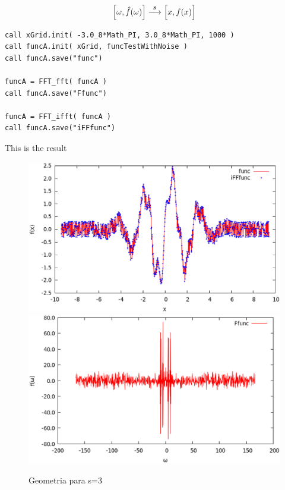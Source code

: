 \begin{equation}
\Bigl[\omega,\hat{f}(\omega)\Bigr]
\stackrel{\text{8}}{\longrightarrow}
\Bigl[x,f(x)\Bigr]
\end{equation}

\lstset{language=Fortran}
\begin{lstlisting}
call xGrid.init( -3.0_8*Math_PI, 3.0_8*Math_PI, 1000 )
call funcA.init( xGrid, funcTestWithNoise )
call funcA.save("func")  
  
funcA = FFT_fft( funcA )  
call funcA.save("Ffunc")  
  
funcA = FFT_ifft( funcA )  
call funcA.save("iFFfunc")  
\end{lstlisting}

This is the result

\begin{figure}[ht]
\centering
\includegraphics[scale=0.36]{images/FFT-func.eps}
\includegraphics[scale=0.36]{images/FFT-Ffunc.eps}
\caption{\footnotesize{
Geometria para s=3
}}
\end{figure}

